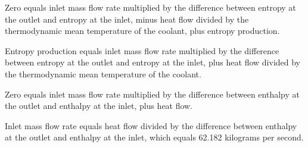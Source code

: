 Zero equals inlet mass flow rate multiplied by the difference between entropy at the outlet and entropy at the inlet, minus heat flow divided by the thermodynamic mean temperature of the coolant, plus entropy production.  

Entropy production equals inlet mass flow rate multiplied by the difference between entropy at the outlet and entropy at the inlet, plus heat flow divided by the thermodynamic mean temperature of the coolant.  

Zero equals inlet mass flow rate multiplied by the difference between enthalpy at the outlet and enthalpy at the inlet, plus heat flow.  

Inlet mass flow rate equals heat flow divided by the difference between enthalpy at the outlet and enthalpy at the inlet, which equals 62.182 kilograms per second.